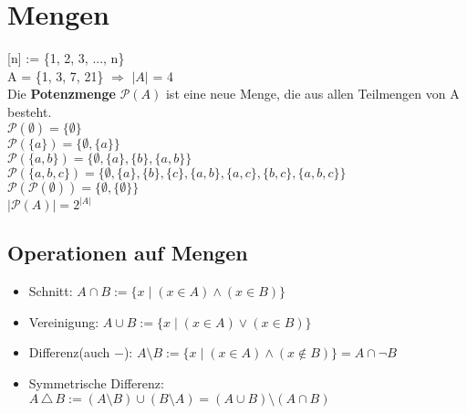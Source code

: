 \documentclass[11pt]{article}
\begin{document}
\section{Mengen}
{[}n{]} := \{1, 2, 3, ..., n\} \\
A = \{1, 3, 7, 21\} $\Rightarrow$ $\mathopen|A\mathclose|$ = 4 \\
Die {\bfseries Potenzmenge} $\mathcal P(A)$ ist eine neue Menge, die aus allen Teilmengen von A besteht. \\
$\mathcal P(\emptyset) = \{ \emptyset \}$ \\
$\mathcal P(\{ a \}) = \bigl\{ \emptyset, \{ a \} \bigr\}$ \\
$\mathcal P(\{ a, b \}) = \bigl\{ \emptyset, \{ a \}, \{ b \}, \{ a, b \} \bigr\}$ \\
$\mathcal P(\{ a, b, c \}) = \bigl\{ \emptyset, \{ a \}, \{ b \}, \{ c \}, \{ a, b \}, \{ a, c \}, \{ b, c \}, \{ a, b, c \} \bigr\}$ \\
$\mathcal P(\mathcal P(\emptyset)) = \bigl\{ \emptyset, \{\emptyset\}\bigr\}$ \\
$\mathopen|\mathcal P(A)\mathclose| = 2^{\mathopen|A\mathclose|}$

\subsection{Operationen auf Mengen}
\begin{itemize}\itemsep0em\small
\item Schnitt: $A \cap B := \{ x \mid \left( x \in A \right) \land \left( x \in B \right) \}$
\item Vereinigung: $A \cup B := \{ x \mid \left( x \in {A} \right) \lor \left( x \in B \right) \}$
\item Differenz(auch $-$): $A \setminus B := \{ x \mid \left( x\in A \right) \land \left( x\not \in B \right) \} = A \cap \neg B$
\item Symmetrische Differenz: $A \, \triangle \, B := \left( A \setminus B \right) \cup \left( B \setminus A \right) = ( A \cup B) \setminus (A \cap B) $
\end{itemize}  \normalsize
\end{document}

